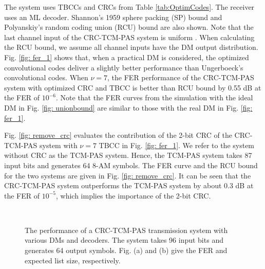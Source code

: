 \documentclass [PhD] {uclathes}
\begin{document}
The system uses TBCCs and CRCs from Table \ref{tab:OptimCodes}.
 The receiver uses an ML decoder. 
Shannon's 1959 sphere packing (SP) bound \cite{shannon1959probability}  and Polyanskiy's random coding union (RCU) bound \cite{polyrcu} are also shown. Note that the last channel input of the CRC-TCM-PAS system is uniform \cite{wang2021achieving}. When calculating the RCU bound, we assume all channel inputs have the DM output distribution.  Fig. \ref{fig: fer_1} shows that, when a practical DM is considered,  the optimized convolutional codes deliver a slightly better performance than Ungerboeck's convolutional codes. When $\nu=7$, the FER performance  of  the CRC-TCM-PAS system with optimized CRC and TBCC is better than RCU bound by 0.55 dB at the FER of $10^{-6}$. Note that the FER curves from the simulation with the ideal DM in Fig. \ref{fig: unionbound} are similar to those with the real DM in Fig. \ref{fig: fer_1}.

Fig. \ref{fig: remove_crc} evaluates the contribution of the 2-bit CRC of the CRC-TCM-PAS system with $\nu=7$ TBCC in  Fig. \ref{fig: fer_1}. We refer to the system without CRC as the TCM-PAS system.
Hence, the TCM-PAS system takes 87 input bits and generates 64 8-AM symbols.
The FER curve and the RCU bound for the two systems are given in Fig. \ref{fig: remove_crc}.  It can be seen that the  CRC-TCM-PAS system outperforms the TCM-PAS system by about 0.3 dB at the FER of $10^{-5}$, which implies the importance of the 2-bit CRC.

\begin{figure}[htp] 
    \centering
   \\
  \caption{ The performance of a CRC-TCM-PAS transmission system with various DMs and decoders. The system takes 96 input bits and generates 64 output symbols. Fig. (a) and (b) give the FER and expected list size, respectively.} \label{fig: sub}
\end{figure}
\end{document}
